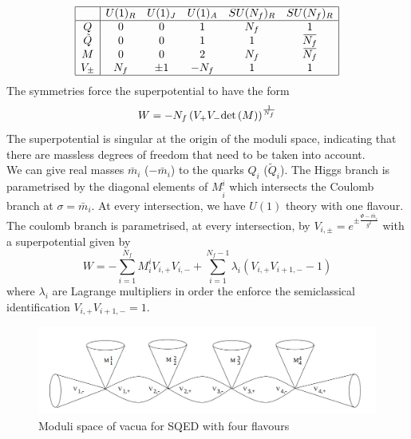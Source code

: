  \begin{equation}
 \begin{array}{ | c | c c c c c |}
 \hline
  & U(1)_R &  U(1)_J & U(1)_A & SU(N_f)_R & SU(N_f)_R \\
 \hline
 Q & 0 & 0  & 1 & N_f & 1  \\  
 \tilde{Q} & 0 & 0  & 1 & 1 & \overbar{N_f}  \\  
   M & 0 &  0 & 2 & N_f & \overbar{N_f}\\  
   V_{\pm} & N_f & \pm 1  & -N_f & 1  &  1\\
   \hline
 \end{array}
\end{equation}
The symmetries force the superpotential to have the form
\begin{equation}
W = - N_f \left(  V_+ V_- \mathrm{det } \,{ (M)} \right)^{\frac{1}{N_f}}
\label{eqn:moduli_space_u1_nfsuperpotential}
\end{equation}
The superpotential is singular at the origin of the moduli space, indicating that there are massless degrees of freedom that need to be taken into account.\\
We can give real masses $\bar{m}_i$ ($-\bar{m}_i$) to the quarks $Q_i$ ($\tilde{Q}_i$).
The Higgs branch is parametrised by the diagonal elements of $M^i_{\tilde{i}}$ which intersects the Coulomb branch at $\sigma = \bar{m}_i$.
At every intersection, we have $U(1)$ theory with one flavour.
The coulomb branch is parametrised, at every intersection, by $V_{i,\pm} = e^{\pm \frac{\Phi - \bar{m}_i}{g^2}} $ with a superpotential given by
\begin{equation}
W = - \sum_{i = 1}^{N_f} M^i_i V_{i,+} V_{i,-} + \sum_{i=1}^{N_f - 1} \lambda_i \left(    V_{i,+} V_{i+1,-} - 1\right)
\end{equation}
where $\lambda_i$ are Lagrange multipliers in order the enforce the semiclassical identification  $ V_{i,+} V_{i+1,-} = 1 $.

\begin{figure}[h!]
\centering
\includegraphics[scale=0.5]{u1_moduli_space_flavours.png}
\caption{Moduli space of vacua for SQED with four flavours}
\end{figure}
















